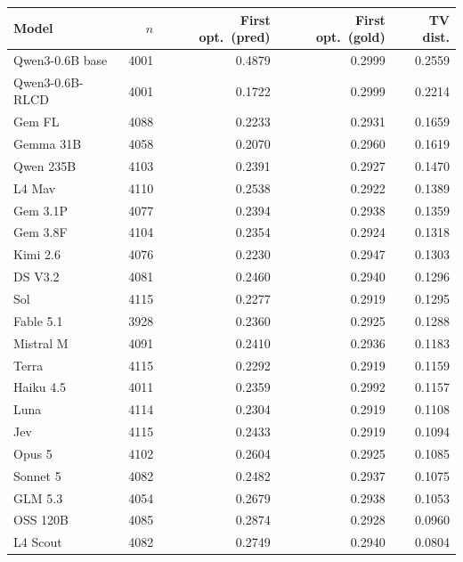 \begin{tabular}{lrrrr}
\toprule
Model & $n$ & First opt.\ (pred) & First opt.\ (gold) & TV dist. \\
\midrule
Qwen3-0.6B base & 4001 & 0.4879 & 0.2999 & 0.2559 \\
Qwen3-0.6B-RLCD & 4001 & 0.1722 & 0.2999 & 0.2214 \\
Gem FL & 4088 & 0.2233 & 0.2931 & 0.1659 \\
Gemma 31B & 4058 & 0.2070 & 0.2960 & 0.1619 \\
Qwen 235B & 4103 & 0.2391 & 0.2927 & 0.1470 \\
L4 Mav & 4110 & 0.2538 & 0.2922 & 0.1389 \\
Gem 3.1P & 4077 & 0.2394 & 0.2938 & 0.1359 \\
Gem 3.8F & 4104 & 0.2354 & 0.2924 & 0.1318 \\
Kimi 2.6 & 4076 & 0.2230 & 0.2947 & 0.1303 \\
DS V3.2 & 4081 & 0.2460 & 0.2940 & 0.1296 \\
Sol & 4115 & 0.2277 & 0.2919 & 0.1295 \\
Fable 5.1 & 3928 & 0.2360 & 0.2925 & 0.1288 \\
Mistral M & 4091 & 0.2410 & 0.2936 & 0.1183 \\
Terra & 4115 & 0.2292 & 0.2919 & 0.1159 \\
Haiku 4.5 & 4011 & 0.2359 & 0.2992 & 0.1157 \\
Luna & 4114 & 0.2304 & 0.2919 & 0.1108 \\
Jev & 4115 & 0.2433 & 0.2919 & 0.1094 \\
Opus 5 & 4102 & 0.2604 & 0.2925 & 0.1085 \\
Sonnet 5 & 4082 & 0.2482 & 0.2937 & 0.1075 \\
GLM 5.3 & 4054 & 0.2679 & 0.2938 & 0.1053 \\
OSS 120B & 4085 & 0.2874 & 0.2928 & 0.0960 \\
L4 Scout & 4082 & 0.2749 & 0.2940 & 0.0804 \\
\bottomrule
\end{tabular}
